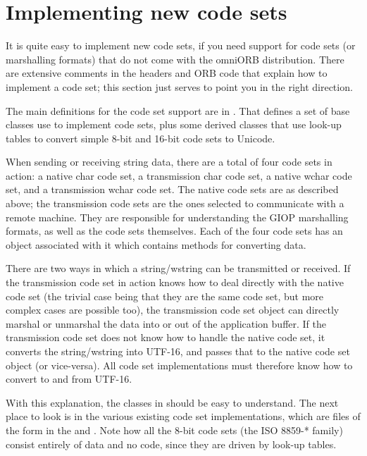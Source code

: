 \documentclass[11pt,oneside,a4paper]{book}
\begin{document}
\section{Implementing new code sets}

It is quite easy to implement new code sets, if you need support for
code sets (or marshalling formats) that do not come with the omniORB
distribution. There are extensive comments in the headers and ORB code
that explain how to implement a code set; this section just serves to
point you in the right direction.

The main definitions for the code set support are in
. That defines a set of base classes
use to implement code sets, plus some derived classes that use look-up
tables to convert simple 8-bit and 16-bit code sets to Unicode.

When sending or receiving string data, there are a total of four code
sets in action: a native char code set, a transmission char code set,
a native wchar code set, and a transmission wchar code set. The native
code sets are as described above; the transmission code sets are the
ones selected to communicate with a remote machine. They are
responsible for understanding the GIOP marshalling formats, as well as
the code sets themselves. Each of the four code sets has an object
associated with it which contains methods for converting data.

There are two ways in which a string/wstring can be transmitted or
received. If the transmission code set in action knows how to deal
directly with the native code set (the trivial case being that they
are the same code set, but more complex cases are possible too), the
transmission code set object can directly marshal or unmarshal the
data into or out of the application buffer. If the transmission code
set does not know how to handle the native code set, it converts the
string/wstring into UTF-16, and passes that to the native code set
object (or vice-versa). All code set implementations must therefore
know how to convert to and from UTF-16.

With this explanation, the classes in  should be easy
to understand. The next place to look is in the various existing code
set implementations, which are files of the form  in the
 and .
Note how all the 8-bit code sets (the ISO 8859-* family) consist
entirely of data and no code, since they are driven by look-up tables.
\end{document}
